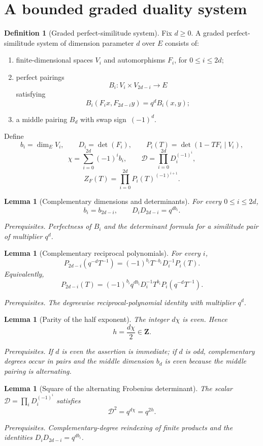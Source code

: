 \documentclass[10pt]{article}
\newtheorem{lemma}[theorem]{Lemma}
\theoremstyle{definition}
\newtheorem{definition}[theorem]{Definition}
\newcommand{\deps}[1]{\par\smallskip\noindent\textit{Prerequisites.} #1}
\begin{document}
\section{A bounded graded duality system}

\begin{definition}[Graded perfect-similitude system]
Fix \(d\geq0\).  A graded perfect-similitude system of dimension parameter
\(d\) over \(E\) consists of:
\begin{enumerate}[label=\textup{(\roman*)}]
\item finite-dimensional spaces \(V_i\) and automorphisms \(F_i\),
      for \(0\leq i\leq2d\);
\item perfect pairings
\[
 B_i:V_i\times V_{2d-i}\longrightarrow E
\]
      satisfying
\[
 B_i(F_ix,F_{2d-i}y)=q^dB_i(x,y);
\]
\item a middle pairing \(B_d\) with swap sign \(\,(-1)^d\).
\end{enumerate}
Define
\[
 b_i=\dim_EV_i,\qquad D_i=\det(F_i),\qquad
 P_i(T)=\det(1-TF_i\mid V_i),
\]
\[
 \chi=\sum_{i=0}^{2d}(-1)^ib_i,\qquad
 \mathcal D=\prod_{i=0}^{2d}D_i^{(-1)^i},
\]
\[
 Z_F(T)=\prod_{i=0}^{2d}P_i(T)^{(-1)^{i+1}}.
\]
\end{definition}

\begin{lemma}[Complementary dimensions and determinants]
For every \(0\leq i\leq2d\),
\[
 b_i=b_{2d-i},\qquad D_iD_{2d-i}=q^{db_i}.
\]
\deps{Perfectness of \(B_i\) and the determinant formula for a similitude
pair of multiplier \(q^d\).}
\end{lemma}

\begin{lemma}[Complementary reciprocal polynomials]
For every \(i\),
\[
 P_{2d-i}(q^{-d}T^{-1})
 =(-1)^{b_i}T^{-b_i}D_i^{-1}P_i(T).
\]
Equivalently,
\[
 P_{2d-i}(T)=(-1)^{b_i}q^{db_i}D_i^{-1}T^{b_i}
 P_i(q^{-d}T^{-1}).
\]
\deps{The degreewise reciprocal-polynomial identity with multiplier
\(q^d\).}
\end{lemma}

\begin{lemma}[Parity of the half exponent]
The integer \(d\chi\) is even.  Hence
\[
 h=\frac{d\chi}{2}\in\mathbf Z.
\]
\deps{If \(d\) is even the assertion is immediate; if \(d\) is odd,
complementary degrees occur in pairs and the middle dimension \(b_d\) is
even because the middle pairing is alternating.}
\end{lemma}

\begin{lemma}[Square of the alternating Frobenius determinant]
The scalar
\(\mathcal D=\prod_iD_i^{(-1)^i}\) satisfies
\[
 \mathcal D^2=q^{d\chi}=q^{2h}.
\]
\deps{Complementary-degree reindexing of finite products and the identities
\(D_iD_{2d-i}=q^{db_i}\).}
\end{lemma}
\end{document}
